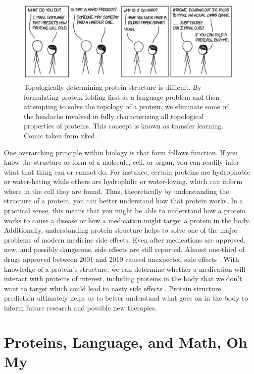 \documentclass{SBCbookchapter}
\begin{document}
\begin{figure}[h!]
	\centerline{\includegraphics[scale=0.7]{rob_long_2.png}}
	\caption{Topologically determining protein structure is difficult. By formulating protein folding first as a language problem and then attempting to solve the topology of a protein, we eliminate 
some of the headache involved in fully characterizing all topological properties of proteins. This concept is known as transfer learning. Comic taken from xkcd \cite{munroe_proteins_2014}.}
	\label{figtwo}
\end{figure}

One overarching principle within biology is that form follows function. If you know the structure or form of a molecule, cell, or organ, you can readily infer what that thing can or cannot do. For 
instance, certain proteins are hydrophobic or water-hating while others are hydrophilic or water-loving, which can inform where in the cell they are found. Thus, theoretically by understanding the 
structure of a protein, you can better understand how that protein works. In a practical sense, this means that you might be able to understand how a protein works to cause a disease or how a medication 
might target a protein in the body. Additionally, understanding protein structure helps to solve one of the major problems of modern medicine \textemdash side effects. Even after medications are 
approved, new, and possibly dangerous, side effects are still reported. Almost one-third of drugs approved between 2001 and 2010 caused unexpected side effects \cite{noauthor_third_2017}. With knowledge 
of a protein's structure, we can determine whether a medication will interact with proteins of interest, including proteins in the body that we don’t want to target which could lead to nasty side 
effects \cite{mizutani_relating_2012}. Protein structure prediction ultimately helps us to better understand what goes on in the body to inform future research and possible new therapies. 

\section{Proteins, Language, and Math, Oh My}
\end{document}
